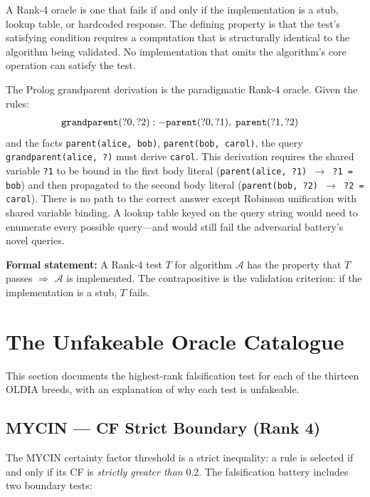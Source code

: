 A Rank-4 oracle is one that fails if and only if the implementation is a stub, lookup table,
or hardcoded response. The defining property is that the test's satisfying condition requires
a computation that is structurally identical to the algorithm being validated. No
implementation that omits the algorithm's core operation can satisfy the test.

The Prolog grandparent derivation is the paradigmatic Rank-4 oracle. Given the rules:
\begin{align}
  \texttt{grandparent}(?0, ?2) &:- \texttt{parent}(?0, ?1),\; \texttt{parent}(?1, ?2) \notag
\end{align}
and the facts \texttt{parent(alice, bob)}, \texttt{parent(bob, carol)}, the query
\texttt{grandparent(alice, ?)} must derive \texttt{carol}. This derivation requires the shared
variable \texttt{?1} to be bound in the first body literal (\texttt{parent(alice, ?1)
$\rightarrow$ ?1 = bob}) and then propagated to the second body literal (\texttt{parent(bob,
?2) $\rightarrow$ ?2 = carol}). There is no path to the correct answer except Robinson
unification with shared variable binding. A lookup table keyed on the query string would need
to enumerate every possible query---and would still fail the adversarial battery's novel
queries.

\textbf{Formal statement:} A Rank-4 test $T$ for algorithm $\mathcal{A}$ has the property that
$T$ passes $\Rightarrow$ $\mathcal{A}$ is implemented. The contrapositive is the validation
criterion: if the implementation is a stub, $T$ fails.

\section{The Unfakeable Oracle Catalogue}
\label{sec:unfakeable-catalogue}

This section documents the highest-rank falsification test for each of the thirteen OLDIA
breeds, with an explanation of why each test is unfakeable.

\subsection{MYCIN --- CF Strict Boundary (Rank 4)}
\label{subsec:mycin-oracle}

The MYCIN certainty factor threshold is a strict inequality: a rule is selected if and only if
its CF is \emph{strictly greater than} 0.2. The falsification battery includes two boundary
tests:

